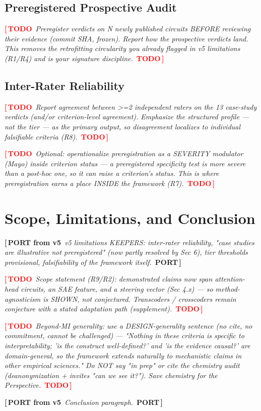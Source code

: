 \documentclass{article}
\newcommand{\TODO}[1]{\par\smallskip\noindent\textcolor{red}{\textbf{[\,TODO}}\ \textit{\textcolor{black!65}{#1}}\ \textcolor{red}{\textbf{TODO\,]}}\par\smallskip}
\newcommand{\PORT}[1]{\par\smallskip\noindent\textcolor{blue!65!black}{\textbf{[\,PORT from v5}}\ \textit{\textcolor{black!65}{#1}}\ \textcolor{blue!65!black}{\textbf{PORT\,]}}\par\smallskip}
\begin{document}
\subsection{Preregistered Prospective Audit}
\TODO{Preregister verdicts on N newly published circuits BEFORE reviewing their evidence
(commit SHA, frozen). Report how the prospective verdicts land. This removes the retrofitting
circularity you already flagged in v5 limitations (R1/R4) and is your signature discipline.}

\subsection{Inter-Rater Reliability}
\TODO{Report agreement between >=2 independent raters on the 13 case-study verdicts (and/or
criterion-level agreement). Emphasize the structured profile --- not the tier --- as the
primary output, so disagreement localizes to individual falsifiable criteria (R8).}

\TODO{Optional: operationalize preregistration as a SEVERITY modulator (Mayo) inside criterion
status --- a preregistered specificity test is more severe than a post-hoc one, so it can raise
a criterion's status. This is where preregistration earns a place INSIDE the framework (R7).}

\section{Scope, Limitations, and Conclusion}
\label{sec:limitations}
\PORT{v5 limitations KEEPERS: inter-rater reliability, "case studies are illustrative not
preregistered" (now partly resolved by Sec 6), tier thresholds provisional, falsifiability
of the framework itself.}
\TODO{Scope statement (R9/R2): demonstrated claims now span attention-head circuits, an SAE
feature, and a steering vector (Sec 4.x) --- so method-agnosticism is SHOWN, not conjectured.
Transcoders / crosscoders remain conjecture with a stated adaptation path (supplement).}
\TODO{Beyond-MI generality: use a DESIGN-generality sentence (no cite, no commitment, cannot be
challenged) --- "Nothing in these criteria is specific to interpretability; 'is the construct
well-defined?' and 'is the evidence causal?' are domain-general, so the framework extends
naturally to mechanistic claims in other empirical sciences." Do NOT say "in prep" or cite the
chemistry audit (deanonymization + invites "can we see it?"). Save chemistry for the Perspective.}
\PORT{Conclusion paragraph.}


\nocite{campbell1963experimental,loevinger1957objective}

\end{document}
